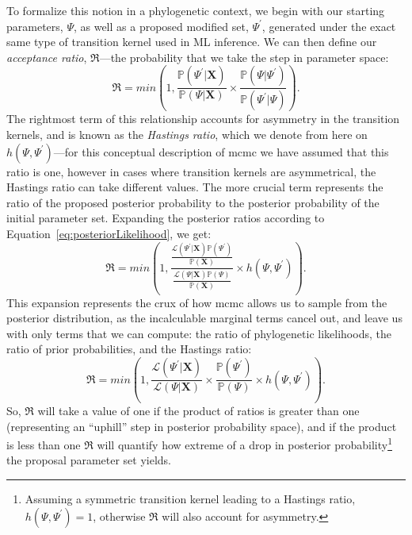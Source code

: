 To formalize this notion in a phylogenetic context, we begin with our starting parameters, $\Psi$, as well as a proposed modified set, $\Psi^{\prime}$, generated under the exact same type of transition kernel used in ML inference.
We can then define our \textit{acceptance ratio}, $\mathfrak{R}$---the probability that we take the step in parameter space:
\begin{equation}
  \mathfrak{R} = 
    min \left( 1, \frac{\mathbb{P}(\Psi^{\prime}|\mathbf{X})}
                       {\mathbb{P}(\Psi|\mathbf{X})} \times 
                         \frac{\mathbb{P}(\Psi|\Psi^{\prime})}
                              {\mathbb{P}(\Psi^{\prime}|\Psi)} \right).
\end{equation}
The rightmost term of this relationship accounts for asymmetry in the transition kernels, and is known as the \textit{Hastings ratio}, which we denote from here on $h(\Psi,\Psi^{\prime})$---for this conceptual description of \gls{mcmc} we have assumed that this ratio is one, however in cases where transition kernels are asymmetrical, the Hastings ratio can take different values.
The more crucial term represents the ratio of the proposed posterior probability to the posterior probability of the initial parameter set.
Expanding the posterior ratios according to Equation~\ref{eq:posteriorLikelihood}, we get:
\begin{equation}
  \mathfrak{R} =
    min \left( 1, \frac{\frac{\mathcal{L}(\Psi^{\prime}|\mathbf{X}) \mathbb{P}(\Psi^{\prime})}
                             {\mathbb{P}(\mathbf{X})}}
                       {\frac{\mathcal{L}(\Psi|\mathbf{X}) \mathbb{P}(\Psi)}
                             {\mathbb{P}(\mathbf{X})}}
                       \times h(\Psi,\Psi^{\prime}) \right).
\end{equation}
This expansion represents the crux of how \gls{mcmc} allows us to sample from the posterior distribution, as the incalculable marginal terms cancel out, and leave us with only terms that we can compute: the ratio of phylogenetic likelihoods, the ratio of prior probabilities, and the Hastings ratio:
\begin{equation}
  \mathfrak{R} =
    min \left( 1, \frac{\mathcal{L}(\Psi^{\prime}|\mathbf{X})}
                       {\mathcal{L}(\Psi|\mathbf{X})}
                  \times
                  \frac{\mathbb{P}(\Psi^{\prime})}
                       {\mathbb{P}(\Psi)}
                  \times
                  h(\Psi,\Psi^{\prime}) \right).
\end{equation}
So, $\mathfrak{R}$ will take a value of one if the product of ratios is greater than one (representing an ``uphill'' step in posterior probability space), and if the product is less than one $\mathfrak{R}$ will quantify how extreme of a drop in posterior probability\footnote{Assuming a symmetric transition kernel leading to a Hastings ratio, $h(\Psi,\Psi^{\prime}) = 1$, otherwise $\mathfrak{R}$ will also account for asymmetry.} the proposal parameter set yields.
